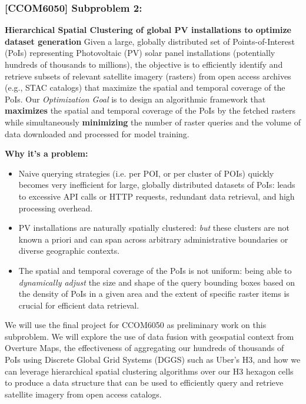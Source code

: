 \subsubsection{[CCOM6050] Subproblem 2:} 
    \textbf{Hierarchical Spatial Clustering of global PV installations to optimize dataset generation} 
    Given a large, globally distributed set of Points-of-Interest (PoIs) representing Photovoltaic (PV) solar panel installations (potentially hundreds of thousands to millions), 
    the objective is to efficiently identify and retrieve subsets of relevant satellite imagery (rasters) from open access archives (e.g., STAC catalogs) that maximize the spatial and temporal coverage of the PoIs. 
    Our \textit{Optimization Goal} is to design an algorithmic framework that \textbf{maximizes} the spatial and temporal coverage of the PoIs by the fetched rasters while simultaneously 
    \textbf{minimizing} the number of raster queries and the volume of data downloaded and processed for model training. 

    \textbf{Why it's a problem:} 
    \begin{itemize}
        \item Naive querying strategies (i.e. per POI, or per cluster of POIs) quickly becomes very inefficient for large, globally distributed datasets of PoIs: 
        leads to excessive API calls or HTTP requests, redundant data retrieval, and high processing overhead.
        \item PV installations are naturally spatially clustered: \textit{but} these clusters are not known a priori and can span across arbitrary administrative boundaries or diverse geographic contexts.
        \item The spatial and temporal coverage of the PoIs is not uniform: being able to \textit{dynamically adjust} the size and shape of the query bounding boxes based on the density of PoIs in a 
        given area and the extent of specific raster items is crucial for efficient data retrieval.
    \end{itemize}

    We will use the final project for CCOM6050 as preliminary work on this subproblem. We will explore the use of data fusion with geospatial context from Overture Maps, the effectiveness of aggregating our hundreds of thousands of PoIs 
    using Discrete Global Grid Systems (DGGS) such as Uber's H3, and how we can leverage hierarchical spatial clustering algorithms over our H3 hexagon cells to produce a data structure that can be used to efficiently query and retrieve
    satellite imagery from open access catalogs.  

